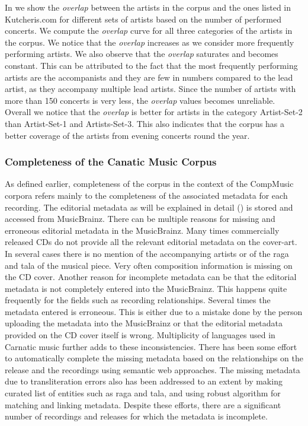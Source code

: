 In  we show the \textit{overlap} between the artists in the corpus and the ones listed in Kutcheris.com for different sets of artists based on the number of performed concerts. We compute the \textit{overlap} curve for all three categories of the artists in the corpus. We notice that the \textit{overlap} increases as we consider more frequently performing artists. We also observe that the \textit{overlap} saturates and becomes constant. This can be attributed to the fact that the most frequently performing artists are the accompanists and they are few in numbers compared to the lead artist, as they accompany multiple lead artists. Since the number of artists with more than 150 concerts is very less, the \textit{overlap}
values becomes unreliable. Overall we notice that the \textit{overlap} is better for artists in the category Artist-Set-2 than Artist-Set-1 and Artists-Set-3. This also indicates that the corpus has a better coverage of the artists from evening concerts round the year.


\subsubsection{Completeness of the Canatic Music Corpus}
\label{sec:corpus_completeness_of_completeness_of_carnatic_music_corpus}

As defined earlier, completeness of the corpus in the context of the CompMusic corpora refers mainly to the completeness of the associated metadata
for each recording. The editorial metadata as will be explained in detail () is stored and accessed from MusicBrainz. There can be multiple reasons for missing and erroneous editorial metadata in the MusicBrainz. Many times commercially released CDs do not provide all the relevant editorial metadata on the cover-art. In several cases there is no mention of the accompanying artists or of the \gls{raga} and \gls{tala} of the musical piece. Very often composition information is missing on the CD cover. Another reason for incomplete metadata can be that the editorial metadata is not completely entered into the MusicBrainz. This happens quite frequently for the fields such as recording relationships. Several times the metadata entered is erroneous. This is either due to a mistake done by the person uploading the metadata into the MusicBrainz or that the editorial metadata provided on the CD cover itself is wrong. Multiplicity of languages used in Carnatic music further adds to these inconsistencies. There has been some effort to automatically complete the missing metadata based on the relationships on the release and the recordings using semantic web approaches. The missing metadata due to transliteration errors also has been addressed to an extent by making curated list of entities such as \gls{raga} and \gls{tala}, and using robust algorithm for matching and linking metadata. Despite these efforts, there are a significant number of recordings and releases for which the metadata is incomplete.


